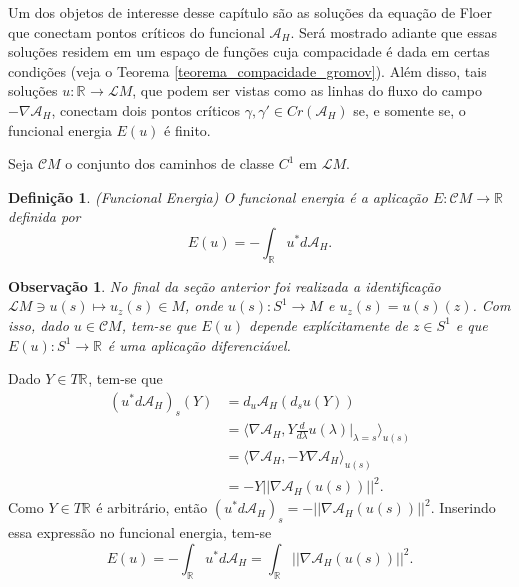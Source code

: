 \documentclass[12pt]{book}
\newtheorem{definicao}[teorema]{Definição}
\newtheorem{observacao}[teorema]{Observação}
\newcommand{\circulo}{S^{1}}
\newcommand{\derivada}[2]{\frac{d #1}{d #2}}
\newcommand{\funcionalH}{\mathcal{A}_{H}}
\newcommand{\gradientefuncional}{\nabla \funcionalH}
\newcommand{\norma}[1]{||#1||}
\newcommand{\pontoscriticos}[1]{\textit{Cr}(#1)}
\newcommand{\produtointerno}[2]{\langle #1, #2 \rangle}
\newcommand{\real}[1]{\mathbb{R}^{#1}}
\newcommand{\reta}{\real{}}
\newcommand{\lacocontrateis}{\mathcal{L}M}
\newcommand{\cilindrosLM}{\mathcal{C}M}
\begin{document}
	Um dos objetos de interesse desse capítulo são as soluções da equação de Floer que conectam pontos críticos do funcional $\funcionalH$. Será mostrado adiante que essas soluções residem em um espaço de funções cuja compacidade é dada em certas condições (veja o Teorema \ref{teorema_compacidade_gromov}). Além disso, tais soluções $u:\reta\to \lacocontrateis$, que podem ser vistas como as linhas do fluxo do campo $-\gradientefuncional$, conectam dois pontos críticos $\gamma, \gamma'\in \pontoscriticos{\funcionalH}$ se, e somente se, o funcional energia $E(u)$ é finito.
	
	Seja $\cilindrosLM$ o conjunto dos caminhos de classe $C^{1}$ em $\lacocontrateis$.
	
	\begin{definicao}
		(Funcional Energia) O funcional energia é a aplicação $E: \cilindrosLM \to \reta$ definida por
		$$
			E(u) = -\int_{\reta}u^{*}d\funcionalH.
		$$
	\end{definicao}
	
	\begin{observacao}
		No final da seção anterior foi realizada a identificação $\lacocontrateis \ni u(s) \mapsto u_{z}(s)\in M $, onde $u(s):\circulo\to M$ e $u_{z}(s) = u(s)(z)$.
		Com isso, dado $u \in \cilindrosLM$, tem-se que $E(u)$ depende explícitamente de $z \in \circulo$ e que $E(u):\circulo\to \reta$ é uma aplicação diferenciável.
	\end{observacao}
	
	Dado $Y \in T\reta$, tem-se que
	$$
	\begin{aligned}
		(u^{*}d\funcionalH)_{s}(Y) &= d_{u}\funcionalH(d_{s}u(Y))
		\\
		&=\produtointerno{\gradientefuncional}{Y\derivada{}{\lambda}u(\lambda)|_{\lambda=s}}_{u(s)}
		\\
		&=\produtointerno{\gradientefuncional}{-Y\gradientefuncional}_{u(s)}
		\\
		&=-Y\norma{\gradientefuncional(u(s))}^{2}.
	\end{aligned}
	$$
	Como $Y\in T\reta$ é arbitrário, então $(u^{*}d\funcionalH)_{s} = -\norma{\gradientefuncional(u(s))}^{2}$. Inserindo essa expressão no funcional energia, tem-se
	$$
	E(u)=-\int_{\reta}u^{*}d\funcionalH = \int_{\reta}\norma{\gradientefuncional(u(s))}^{2}.
	$$
	
\end{document}
